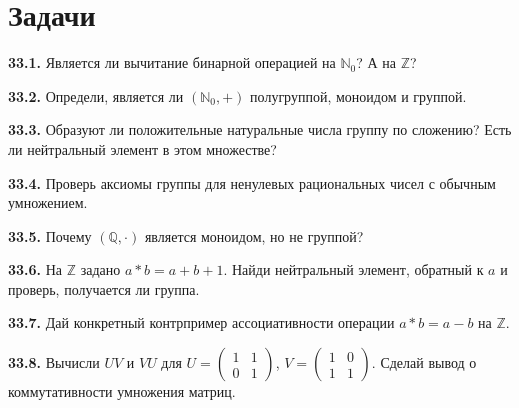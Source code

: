 \section*{Задачи}
\begingroup\setlength{\parskip}{2pt}
\noindent\begin{minipage}[t]{\linewidth}\textbf{33.1.} Является ли вычитание бинарной операцией на \(\mathbb N_0\)? А на \(\mathbb Z\)?\par\end{minipage}\par
\noindent\begin{minipage}[t]{\linewidth}\textbf{33.2.} Определи, является ли \((\mathbb N_0,+)\) полугруппой, моноидом и группой.\par\end{minipage}\par
\noindent\begin{minipage}[t]{\linewidth}\textbf{33.3.} Образуют ли положительные натуральные числа группу по сложению? Есть ли нейтральный элемент в этом множестве?\par\end{minipage}\par
\noindent\begin{minipage}[t]{\linewidth}\textbf{33.4.} Проверь аксиомы группы для ненулевых рациональных чисел с обычным умножением.\par\end{minipage}\par
\noindent\begin{minipage}[t]{\linewidth}\textbf{33.5.} Почему \((\mathbb Q,\cdot)\) является моноидом, но не группой?\par\end{minipage}\par
\noindent\begin{minipage}[t]{\linewidth}\textbf{33.6.}\starmark{} На \(\mathbb Z\) задано \(a*b=a+b+1\). Найди нейтральный элемент, обратный к \(a\) и проверь, получается ли группа.\par\end{minipage}\par
\noindent\begin{minipage}[t]{\linewidth}\textbf{33.7.} Дай конкретный контрпример ассоциативности операции \(a*b=a-b\) на \(\mathbb Z\).\par\end{minipage}\par
\noindent\begin{minipage}[t]{\linewidth}\textbf{33.8.} Вычисли \(UV\) и \(VU\) для \(U=\begin{pmatrix}1&1\\0&1\end{pmatrix}\), \(V=\begin{pmatrix}1&0\\1&1\end{pmatrix}\). Сделай вывод о коммутативности умножения матриц.\par\end{minipage}\par
